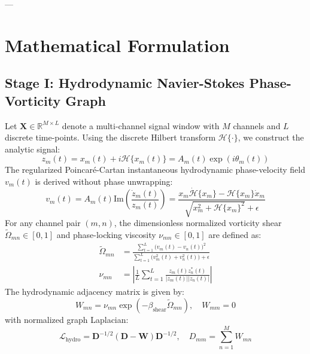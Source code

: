 \documentclass[journal,twocolumn,10pt]{IEEEtran}
\begin{document}
---

\section{Mathematical Formulation}

\subsection{Stage I: Hydrodynamic Navier-Stokes Phase-Vorticity Graph}
Let $\mathbf{X} \in \mathbb{R}^{M \times L}$ denote a multi-channel signal window with $M$ channels and $L$ discrete time-points. Using the discrete Hilbert transform $\mathcal{H}\{\cdot\}$, we construct the analytic signal:
\begin{equation}
z_m(t) = x_m(t) + i \mathcal{H}\{x_m(t)\} = A_m(t) \exp(i \theta_m(t))
\end{equation}
The regularized Poincar\'e-Cartan instantaneous hydrodynamic phase-velocity field $v_m(t)$ is derived without phase unwrapping:
\begin{equation}
v_m(t) = A_m(t) \text{Im}\left( \frac{\dot{z}_m(t)}{z_m(t)} \right) = \frac{x_m \dot{\mathcal{H}}\{x_m\} - \mathcal{H}\{x_m\} \dot{x}_m}{\sqrt{x_m^2 + \mathcal{H}\{x_m\}^2} + \epsilon}
\end{equation}
For any channel pair $(m, n)$, the dimensionless normalized vorticity shear $\tilde{\Omega}_{mn} \in [0, 1]$ and phase-locking viscosity $\nu_{mn} \in [0, 1]$ are defined as:
\begin{align}
\tilde{\Omega}_{mn} &= \frac{\sum_{t=1}^L \big( v_m(t) - v_n(t) \big)^2}{\sum_{t=1}^L \big( v_m^2(t) + v_n^2(t) \big) + \epsilon} \\
\nu_{mn} &= \left| \frac{1}{L} \sum_{t=1}^L \frac{z_m(t) z_n^*(t)}{|z_m(t)| |z_n(t)|} \right|
\end{align}
The hydrodynamic adjacency matrix is given by:
\begin{equation}
W_{mn} = \nu_{mn} \exp\left( -\beta_{\text{shear}} \tilde{\Omega}_{mn} \right), \quad W_{mm} = 0
\end{equation}
with normalized graph Laplacian:
\begin{equation}
\mathcal{L}_{\text{hydro}} = \mathbf{D}^{-1/2} (\mathbf{D} - \mathbf{W}) \mathbf{D}^{-1/2}, \quad D_{mm} = \sum_{n=1}^M W_{mn}
\end{equation}
\end{document}
